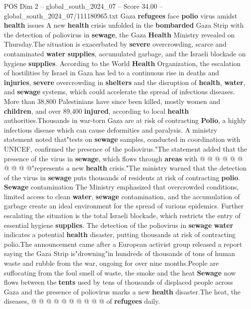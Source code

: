 \begin{textsample}{POS Dim 2 – global\_south\_2024\_07 – Score 34.00 – global\_south\_2024\_07/111180965.txt}  \label{ex:f2_pos_161}
Gaza \textbf{refugees} face \textbf{polio} virus amidst \textbf{health} issues A new \textbf{health} crisis unfolded in the \textbf{bombarded} Gaza Strip with the detection of poliovirus in \textbf{sewage}, the Gaza \textbf{Health} Ministry revealed on Thursday.The situation is exacerbated by \textbf{severe} overcrowding, scarce and contaminated \textbf{water} \textbf{supplies}, accumulated garbage, and the Israeli blockade on hygiene \textbf{supplies}.
According to the World \textbf{Health} Organization, the escalation of hostilities by Israel in Gaza has led to a continuous rise in deaths and \textbf{injuries}, \textbf{severe} overcrowding in \textbf{shelters} and the disruption of \textbf{health}, \textbf{water}, and \textbf{sewage} systems, which could accelerate the spread of infectious diseases.
More than 38,800 Palestinians have since been killed, mostly women and \textbf{children}, and over 89,400 \textbf{injured}, according to local \textbf{health} authorities.Thousands in war-torn Gaza are at risk of contracting \textbf{Polio}, a highly infectious disease which can cause deformities and paralysis.
A ministry statement noted that"tests on \textbf{sewage} samples, conducted in coordination with UNICEF, confirmed the presence of the poliovirus."The statement added that the presence of the virus in \textbf{sewage}, which flows through \textbf{areas} with @ @ @ @ @ @ @ @ @ @"represents a new \textbf{health} crisis."The ministry warned that the detection of the virus in \textbf{sewage} puts thousands of residents at risk of contracting \textbf{polio}. \textbf{Sewage} contamination The Ministry emphasized that overcrowded conditions, limited access to clean \textbf{water}, \textbf{sewage} contamination, and the accumulation of garbage create an ideal environment for the spread of various epidemics.
Further escalating the situation is the total Israeli blockade, which restricts the entry of essential hygiene \textbf{supplies}.
The detection of the poliovirus in \textbf{sewage} \textbf{water} indicates a potential \textbf{health} disaster, putting thousands at risk of contracting polio.The announcement came after a European activist group released a report saying the Gaza Strip is"drowning"in hundreds of thousands of tons of human waste and rubble from the war, ongoing for over nine months.People are suffocating from the foul smell of waste, the smoke and the heat \textbf{Sewage} now flows between the \textbf{tents} used by tens of thousands of displaced people across Gaza and the presence of poliovirus marks a new \textbf{health} disaster.The heat, the diseases, @ @ @ @ @ @ @ @ @ @ of \textbf{refugees} daily.

\end{textsample}
